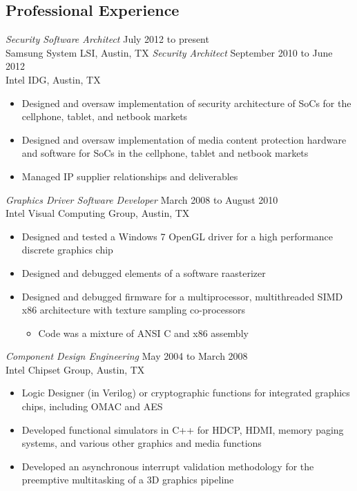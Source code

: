 \documentclass[margin]{res}
\begin{document}
\begin{resume}
\section{Professional Experience}
{\sl Security Software Architect} \hfill July 2012 to present \\
	Samsung System LSI, Austin, TX
{\sl Security Architect} \hfill September 2010 to June 2012 \\
	Intel IDG, Austin, TX
\begin{itemize}
	\item Designed and oversaw implementation of security architecture of SoCs for the cellphone, tablet, and netbook markets
	\item Designed and oversaw implementation of media content protection hardware and software for SoCs in the cellphone, tablet and netbook markets
	\item Managed IP supplier relationships and deliverables
\end{itemize}
{\sl Graphics Driver Software Developer} \hfill March 2008 to August 2010 \\
	Intel Visual Computing Group, Austin, TX
\begin{itemize}
	\item Designed and tested a Windows 7 OpenGL driver for a high performance discrete graphics chip
	\item Designed and debugged elements of a software raasterizer
	\item Designed and debugged firmware for a multiprocessor, multithreaded SIMD x86 architecture with texture sampling co-processors
	\begin{itemize}
		\item Code was a mixture of ANSI C and x86 assembly
	\end{itemize}
\end{itemize}
{\sl Component Design Engineering} \hfill May 2004 to March 2008 \\
	Intel Chipset Group, Austin, TX
\begin{itemize}
	\item Logic Designer (in Verilog) or cryptographic functions for integrated graphics chips, including OMAC and AES
	\item Developed functional simulators in C++ for HDCP, HDMI, memory paging systems, and various other graphics and media functions
	\item Developed an asynchronous interrupt validation methodology for the preemptive multitasking of a 3D graphics pipeline
\end{itemize}

\end{resume}
\end{document}
